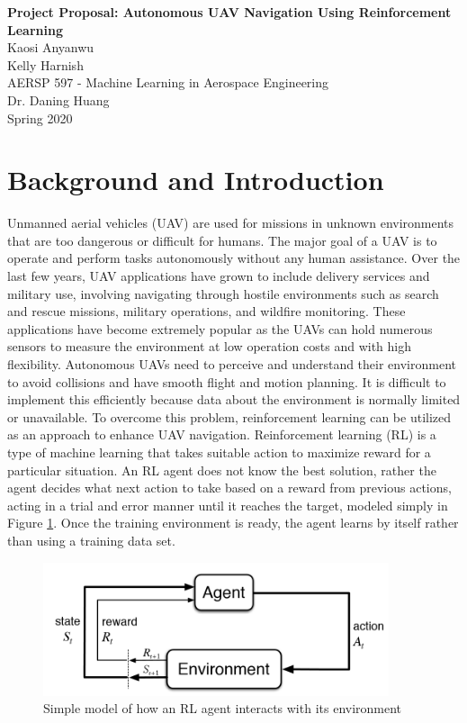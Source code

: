 \documentclass[12pt]{article}
\begin{document}
\begin{center}
	\textbf{\Large Project Proposal: Autonomous UAV Navigation Using Reinforcement Learning \\ }
	\normalsize \bigskip
	Kaosi Anyanwu \\
	Kelly Harnish \\
	\bigskip
	AERSP 597 - Machine Learning in Aerospace Engineering \\
	Dr. Daning Huang \\
	\medskip
	Spring 2020 \\
\end{center}

\section{Background and Introduction}

Unmanned aerial vehicles (UAV) are used for missions in unknown environments that are too dangerous or difficult for humans. The major goal of a UAV is to operate and perform tasks autonomously without any human assistance. Over the last few years, UAV applications have grown to include delivery services and military use, involving navigating through hostile environments such as search and rescue missions, military operations, and wildfire monitoring. These applications have become extremely popular as the UAVs can hold numerous sensors to measure the environment at low operation costs and with high flexibility. Autonomous UAVs need to perceive and understand their environment to avoid collisions and have smooth flight and motion planning. It is difficult to implement this efficiently because data about the environment is normally limited or unavailable. To overcome this problem, reinforcement learning can be utilized as an approach to enhance UAV navigation. Reinforcement learning (RL) is a type of machine learning that takes suitable action to maximize reward for a particular situation. An RL agent does not know the best solution, rather the agent decides what next action to take based on a reward from previous actions, acting in a trial and error manner until it reaches the target, modeled simply in Figure \ref{fig:RLmodel}. Once the training environment is ready, the agent learns by itself rather than using a training data set. 

\begin{figure}[!htb]
	\centering\includegraphics[width=4in]{RL_agent}
	\caption{\label{fig:RLmodel} Simple model of how an RL agent interacts with its environment}
\end{figure}
\end{document}
